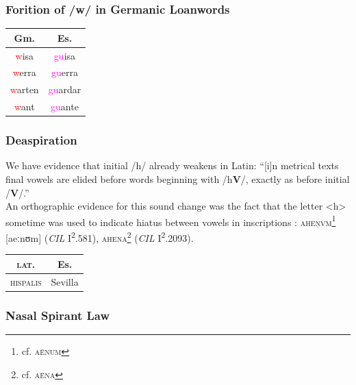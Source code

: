 \documentclass{report}[12pt]
\begin{document}
\subsubsection*{Forition of /w/ in Germanic Loanwords}

\begin{tabular}{c c}
  Gm. & Es. \\  
  \hline
  \textcolor{red}{w}isa & \textcolor{magenta}{gu}isa \\
  \textcolor{red}{w}erra & \textcolor{magenta}{gu}erra \\
  \textcolor{red}{w}arten & \textcolor{magenta}{gu}ardar \\
  \textcolor{red}{w}ant & \textcolor{magenta}{gu}ante \\
\end{tabular}

\subsubsection*{Deaspiration}

\begin{tcolorbox}
  
\end{tcolorbox}

We have evidence that initial /h/ already weakens in Latin: ``[i]n metrical texts final vowels are elided before words beginning with /h\textbf{V}/, exactly as before initial /\textbf{V}/.'' \parencite[p.~87]{companion_to_latin} \\
An orthographic evidence for this sound change was the fact that the letter <h> sometime was used to indicate hiatus between vowels in inscriptions \parencite[p.~18]{companion_to_latin}: \textsc{ahenvm}\footnote{cf. \textsc{a\={e}num}} [aeːnʊm] (\emph{CIL} I\textsuperscript{2}.581), \textsc{ahena}\footnote{cf. \textsc{a\={e}na}} (\emph{CIL} I\textsuperscript{2}.2093).

\begin{tabular}{c c}
  \textsc{lat.} & Es. \\
  \hline
  \textsc{hispalis} & Sevilla
\end{tabular}

\subsubsection*{Nasal Spirant Law}

\begin{tcolorbox}

\end{tcolorbox}
\end{document}
